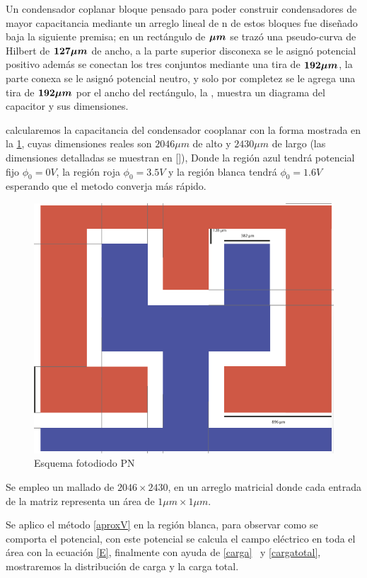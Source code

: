 
Un condensador coplanar bloque pensado para poder construir condensadores de mayor capacitancia mediante un arreglo lineal de n de estos bloques fue diseñado baja la siguiente premisa; en un rectángulo 
de  $\boldsymbol{\mu m}$ se trazó una pseudo-curva de Hilbert de $\boldsymbol{127 \mu m}$ de ancho, a la parte superior disconexa se le asignó potencial positivo además se conectan los tres conjuntos mediante
una tira de $\boldsymbol{ 192\mu m}$, la parte conexa se le asignó potencial neutro, y solo por completez se le agrega una tira de $\boldsymbol{192 \mu m}$ por el ancho del rectángulo, la , muestra un 
diagrama del capacitor y sus dimensiones.

calcularemos la capacitancia del condensador cooplanar con la forma mostrada en la \ref{fig:capacitor}, cuyas dimensiones reales son  $2046 \mu m$ de alto y  $2430 \mu m$ de largo (las dimensiones detalladas
 se muestran en []), Donde la región azul tendrá potencial fijo $\phi_0=0V$, la región roja  $\phi_0=3.5V$ y la región blanca tendrá  $\phi_0=1.6V$ esperando que el metodo converja más rápido. 
\begin{figure}[H]
		\centering
		\includegraphics[width=0.8\columnwidth]{img/problema.png}

		\caption{Esquema fotodiodo PN }
		\label{fig:capacitor}
\end{figure}

Se empleo un mallado de $2046 \times 2430$, en un arreglo matricial donde cada entrada de la matriz representa un área de $ 1 \mu m \times  1 \mu m$. 

Se aplico el método \ref{aproxV} en la región blanca, para observar como se comporta el potencial, con este potencial se calcula el campo eléctrico en toda el área con la ecuación \ref{E}, finalmente con ayuda de \ref{carga} \ y \ref{cargatotal}, mostraremos la distribución de carga y la carga total. 

